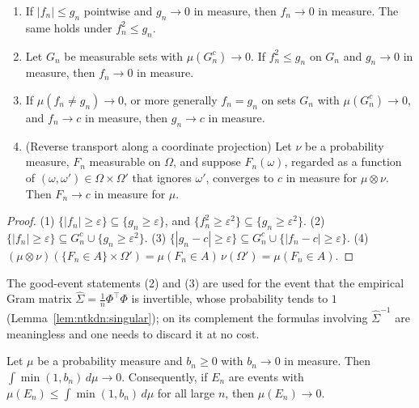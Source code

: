 \begin{lemma}\label{lem:ntkcond:mconvDomination}
  \leanok
\begin{enumerate}
  \item If $|f_n|\le g_n$ pointwise and $g_n\to0$ in measure, then $f_n\to0$ in measure. The same holds under $f_n^2\le g_n$.
  \item Let $G_n$ be measurable sets with $\mu(G_n^c)\to0$. If $f_n^2\le g_n$ on $G_n$ and $g_n\to0$ in measure, then $f_n\to0$ in measure.
  \item If $\mu(f_n\ne g_n)\to0$, or more generally $f_n=g_n$ on sets $G_n$ with $\mu(G_n^c)\to0$, and $f_n\to c$ in measure, then $g_n\to c$ in measure.
  \item (Reverse transport along a coordinate projection) Let $\nu$ be a probability measure, $F_n$ measurable on $\Omega$, and suppose $F_n(\omega)$, regarded as a function of $(\omega,\omega')\in\Omega\times\Omega'$ that ignores $\omega'$, converges to $c$ in measure for $\mu\otimes\nu$. Then $F_n\to c$ in measure for $\mu$.
\end{enumerate}
\end{lemma}

\begin{proof}
  \leanok
(1) $\{|f_n|\ge\varepsilon\}\subseteq\{g_n\ge\varepsilon\}$, and $\{f_n^2\ge\varepsilon^2\}\subseteq\{g_n\ge\varepsilon^2\}$. (2) $\{|f_n|\ge\varepsilon\}\subseteq G_n^c\cup\{g_n\ge\varepsilon^2\}$. (3) $\{|g_n-c|\ge\varepsilon\}\subseteq G_n^c\cup\{|f_n-c|\ge\varepsilon\}$. (4) $(\mu\otimes\nu)(\{F_n\in A\}\times\Omega')=\mu(F_n\in A)\,\nu(\Omega')=\mu(F_n\in A)$.
\end{proof}

The good-event statements (2) and (3) are used for the event that the empirical Gram matrix $\hat\Sigma=\tfrac1n\Phi^\top\Phi$ is invertible, whose probability tends to $1$ (Lemma~\ref{lem:ntkdn:singular}); on its complement the formulas involving $\hat\Sigma^{-1}$ are meaningless and one needs to discard it at no cost.

\begin{lemma}\label{lem:ntkcond:mconvSqueeze}
  \leanok
Let $\mu$ be a probability measure and $b_n\ge0$ with $b_n\to0$ in measure. Then $\int\min(1,b_n)\,d\mu\to0$. Consequently, if $E_n$ are events with $\mu(E_n)\le\int\min(1,b_n)\,d\mu$ for all large $n$, then $\mu(E_n)\to0$.
\end{lemma}


